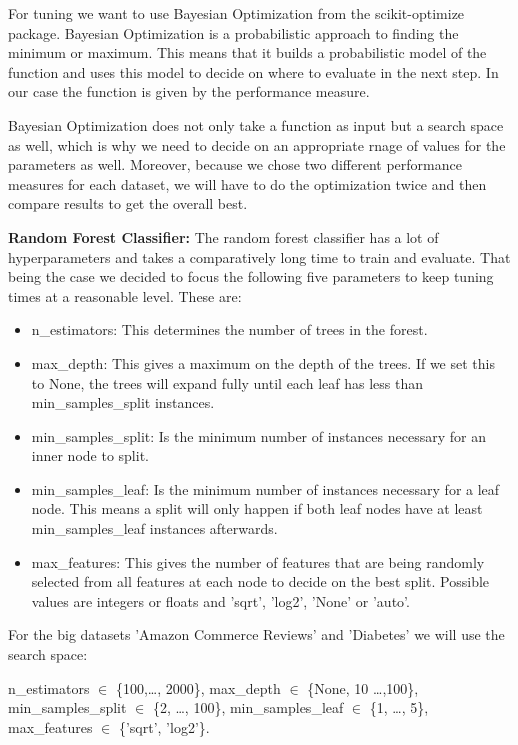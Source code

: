 \documentclass[a4paper,10pt]{article}
\begin{document}
For tuning we want to use Bayesian Optimization from the scikit-optimize package. Bayesian Optimization is a probabilistic approach to finding the minimum or maximum. This means that it builds a probabilistic model of the function and uses this model to decide on where to evaluate in the next step. In our case the function is given by the performance measure. 

Bayesian Optimization does not only take a function as input but a search space as well, which is why we need to decide on an appropriate rnage of values for the parameters as well. Moreover, because we chose two different performance measures for each dataset, we will have to do the optimization twice and then compare results to get the overall best.

\textbf{Random Forest Classifier:} The random forest classifier has a lot of hyperparameters and takes a comparatively long time to train and evaluate. That being the case we decided to focus the following five parameters to keep tuning times at a reasonable level. These are:

\begin{itemize}
    \item \textsf{n\_estimators}: This determines the number of trees in the forest.
\item \textsf{max\_depth}: This gives a maximum on the depth of the trees. If we set this to None, the trees will expand fully until each leaf has less than \textsf{min\_samples\_split} instances.
\item \textsf{min\_samples\_split}: Is the minimum number of instances necessary for an inner node to split.
\item \textsf{min\_samples\_leaf}: Is the minimum number of instances necessary for a leaf node. This means a split will only happen if both leaf nodes have at least \textsf{min\_samples\_leaf} instances afterwards.
\item \textsf{max\_features}: This gives the number of features that are being randomly selected from all features at each node to decide on the best split. Possible values are integers or floats and 'sqrt', 'log2', 'None' or 'auto'.
\end{itemize}


For the big datasets 'Amazon Commerce Reviews' and 'Diabetes' we will use the search space:
 

\begin{center}
    \parbox{0.75\textwidth}{%
    \raggedright
    \textsf{n\_estimators} \(\in\) \{100,\dots, 2000\}, \textsf{max\_depth} \(\in\) \{None, 10 \dots ,100\}, \\
    \textsf{min\_samples\_split} \(\in\) \{2, \dots, 100\}, \textsf{min\_samples\_leaf} \(\in\) \{1, \dots, 5\}, \\
    \textsf{max\_features} \(\in\) \{'sqrt', 'log2'\}.}
\end{center}
\end{document}
